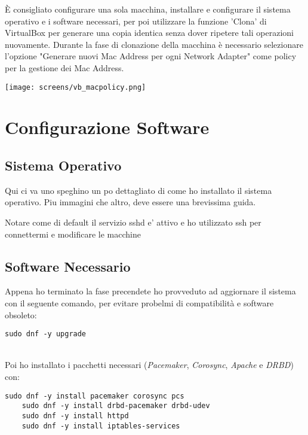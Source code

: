 \`{E} consigliato configurare una sola macchina, installare e configurare il sistema operativo e i software necessari, per poi utilizzare la funzione 'Clona' di VirtualBox per generare una copia identica senza dover ripetere tali operazioni nuovamente. Durante la fase di clonazione della macchina \`{e} necessario selezionare l'opzione "Generare nuovi Mac Address per ogni Network Adapter" come policy per la gestione dei Mac Address.

\begin{center}
	\texttt{[image: screens/vb\_macpolicy.png]}
\end{center}
 
\section{Configurazione Software}


\subsection{Sistema Operativo}

Qui ci va uno speghino un po dettagliato di come ho installato il sistema operativo. Piu immagini che altro, deve essere una brevissima guida.

Notare come di default il servizio sshd e' attivo e ho utilizzato ssh per connettermi e modificare le macchine

\subsection{Software Necessario}

Appena ho terminato la fase precendete ho provveduto ad aggiornare il sistema con il seguente comando, per evitare probelmi di compatibilit\`{a} e software obsoleto:

\begin{lstlisting}[style=cmd]
	sudo dnf -y upgrade
\end{lstlisting} 
\ \\
Poi ho installato i pacchetti necessari (\textit{Pacemaker}, \textit{Corosync}, \textit{Apache} e \textit{DRBD}) con: 

\begin{lstlisting}[style=cmd]
	sudo dnf -y install pacemaker corosync pcs
	sudo dnf -y install drbd-pacemaker drbd-udev
	sudo dnf -y install httpd
	sudo dnf -y install iptables-services
\end{lstlisting} 

